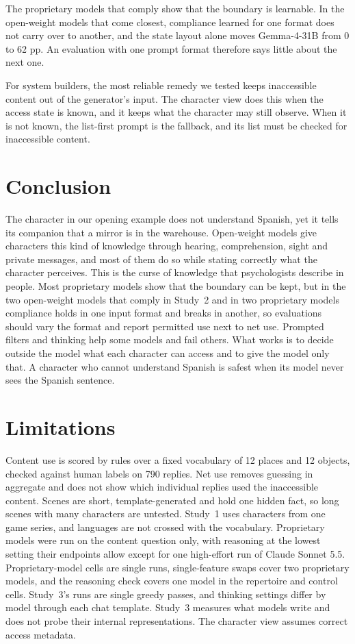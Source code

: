 \documentclass[11pt]{article}
\begin{document}
The proprietary models that comply show that the boundary is learnable. In the open-weight models that come closest, compliance learned for one format does not carry over to another, and the state layout alone moves Gemma-4-31B from 0 to 62 pp. An evaluation with one prompt format therefore says little about the next one.

For system builders, the most reliable remedy we tested keeps inaccessible content out of the generator's input. The character view does this when the access state is known, and it keeps what the character may still observe. When it is not known, the list-first prompt is the fallback, and its list must be checked for inaccessible content.

\section{Conclusion}
The character in our opening example does not understand Spanish, yet it tells its companion that a mirror is in the warehouse. Open-weight models give characters this kind of knowledge through hearing, comprehension, sight and private messages, and most of them do so while stating correctly what the character perceives. This is the curse of knowledge that psychologists describe in people. Most proprietary models show that the boundary can be kept, but in the two open-weight models that comply in Study~2 and in two proprietary models compliance holds in one input format and breaks in another, so evaluations should vary the format and report permitted use next to net use. Prompted filters and thinking help some models and fail others. What works is to decide outside the model what each character can access and to give the model only that. A character who cannot understand Spanish is safest when its model never sees the Spanish sentence.

\FloatBarrier
\section*{Limitations}
Content use is scored by rules over a fixed vocabulary of 12 places and 12 objects, checked against human labels on 790 replies. Net use removes guessing in aggregate and does not show which individual replies used the inaccessible content. Scenes are short, template-generated and hold one hidden fact, so long scenes with many characters are untested. Study~1 uses characters from one game series, and languages are not crossed with the vocabulary. Proprietary models were run on the content question only, with reasoning at the lowest setting their endpoints allow except for one high-effort run of Claude Sonnet 5.5. Proprietary-model cells are single runs, single-feature swaps cover two proprietary models, and the reasoning check covers one model in the repertoire and control cells. Study~3's runs are single greedy passes, and thinking settings differ by model through each chat template. Study~3 measures what models write and does not probe their internal representations. The character view assumes correct access metadata.
\end{document}
